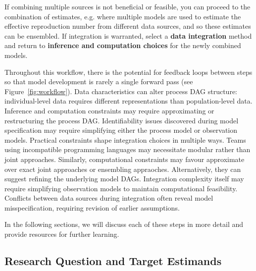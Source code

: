 \documentclass{article}
\begin{document}
If combining multiple sources is not beneficial or feasible, you can proceed to the combination of estimates, e.g. where multiple models are used to estimate the effective reproduction number from different data sources, and so these estimates can be ensembled.
If integration is warranted, select a \textbf{data integration} method and return to \textbf{inference and computation choices} for the newly combined models.

Throughout this workflow, there is the potential for feedback loops between steps so that model development is rarely a single forward pass (see Figure~\ref{fig:workflow}). 
Data characteristics can alter process DAG structure: individual-level data requires different representations than population-level data. 
Inference and computation constraints may require approximating or restructuring the process DAG.
Identifiability issues discovered during model specification may require simplifying either the process model or observation models. 
Practical constraints shape integration choices in multiple ways. 
Teams using incompatible programming languages may necessitate modular rather than joint approaches. 
Similarly, computational constraints may favour approximate over exact joint approaches or ensembling appraoches.
Alternatively, they can suggest refining the underlying model DAGs.
Integration complexity itself may require simplifying observation models to maintain computational feasibility. 
Conflicts between data sources during integration often reveal model misspecification, requiring revision of earlier assumptions.

In the following sections, we will discuss each of these steps in more detail and provide resources for further learning.

\subsection{Research Question and Target Estimands}
\end{document}
